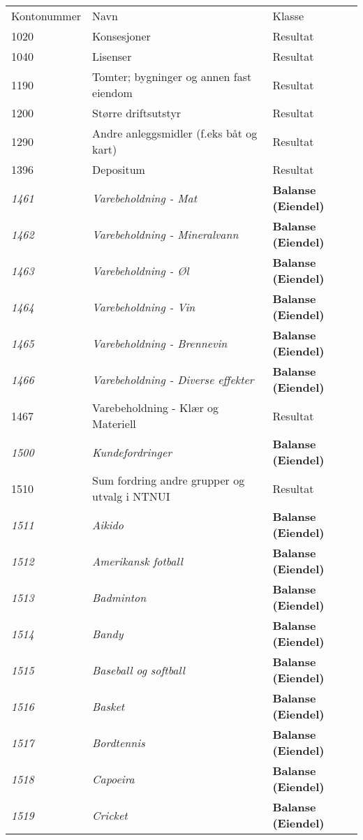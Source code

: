 \begin{longtable}{l l l} 
Kontonummer & Navn & Klasse \\
1020 & Konsesjoner & Resultat\\
1040 & Lisenser & Resultat\\
1190 & Tomter; bygninger og annen fast eiendom & Resultat\\
1200 & Større driftsutstyr & Resultat\\
1290 & Andre anleggsmidler (f.eks båt og kart) & Resultat\\
1396 & Depositum & Resultat\\
\emph{1461} & \emph{Varebeholdning - Mat} & {\bfseries Balanse (Eiendel)}\\
\emph{1462} & \emph{Varebeholdning - Mineralvann} & {\bfseries Balanse (Eiendel)}\\
\emph{1463} & \emph{Varebeholdning - Øl} & {\bfseries Balanse (Eiendel)}\\
\emph{1464} & \emph{Varebeholdning - Vin} & {\bfseries Balanse (Eiendel)}\\
\emph{1465} & \emph{Varebeholdning - Brennevin} & {\bfseries Balanse (Eiendel)}\\
\emph{1466} & \emph{Varebeholdning - Diverse effekter} & {\bfseries Balanse (Eiendel)}\\
1467 & Varebeholdning - Klær og Materiell & Resultat\\
\emph{1500} & \emph{Kundefordringer} & {\bfseries Balanse (Eiendel)}\\
1510 & Sum fordring andre grupper og utvalg i NTNUI & Resultat\\
\emph{1511} & \emph{Aikido} & {\bfseries Balanse (Eiendel)}\\
\emph{1512} & \emph{Amerikansk fotball} & {\bfseries Balanse (Eiendel)}\\
\emph{1513} & \emph{Badminton} & {\bfseries Balanse (Eiendel)}\\
\emph{1514} & \emph{Bandy} & {\bfseries Balanse (Eiendel)}\\
\emph{1515} & \emph{Baseball og softball} & {\bfseries Balanse (Eiendel)}\\
\emph{1516} & \emph{Basket} & {\bfseries Balanse (Eiendel)}\\
\emph{1517} & \emph{Bordtennis} & {\bfseries Balanse (Eiendel)}\\
\emph{1518} & \emph{Capoeira} & {\bfseries Balanse (Eiendel)}\\
\emph{1519} & \emph{Cricket} & {\bfseries Balanse (Eiendel)}\\

\end{longtable}
